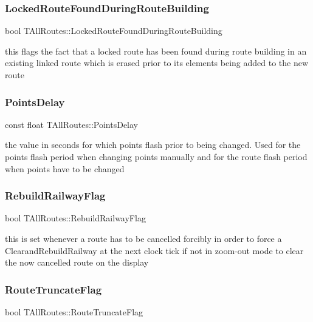 \subsubsection{\texorpdfstring{Locked\+Route\+Found\+During\+Route\+Building}{LockedRouteFoundDuringRouteBuilding}}
{\footnotesize\ttfamily bool T\+All\+Routes\+::\+Locked\+Route\+Found\+During\+Route\+Building}

this flags the fact that a locked route has been found during route building in an existing linked route which is erased prior to its elements being added to the new route \mbox{\label{class_t_all_routes_a7f0e30f383ca3cb65ab72d102c162316}} 
\subsubsection{\texorpdfstring{Points\+Delay}{PointsDelay}}
{\footnotesize\ttfamily const float T\+All\+Routes\+::\+Points\+Delay}

the value in seconds for which points flash prior to being changed. Used for the points flash period when changing points manually and for the route flash period when points have to be changed \mbox{\label{class_t_all_routes_a140f03788fbf646cb07f3c51f1f19175}} 
\subsubsection{\texorpdfstring{Rebuild\+Railway\+Flag}{RebuildRailwayFlag}}
{\footnotesize\ttfamily bool T\+All\+Routes\+::\+Rebuild\+Railway\+Flag}

this is set whenever a route has to be cancelled forcibly in order to force a Clearand\+Rebuild\+Railway at the next clock tick if not in zoom-\/out mode to clear the now cancelled route on the display \mbox{\label{class_t_all_routes_a86d544429dcddbcbe43e63c8879128ee}} 
\subsubsection{\texorpdfstring{Route\+Truncate\+Flag}{RouteTruncateFlag}}
{\footnotesize\ttfamily bool T\+All\+Routes\+::\+Route\+Truncate\+Flag}


